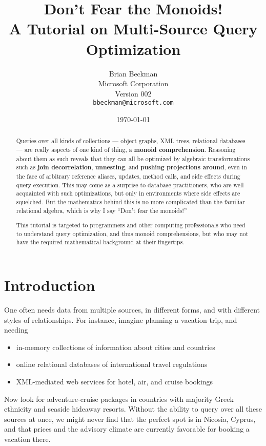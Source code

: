 \title{Don't Fear the Monoids!\\A Tutorial on Multi-Source Query Optimization}
\author{Brian Beckman
\\ Microsoft Corporation  
\\ Version 002
\\ \texttt{bbeckman@microsoft.com}
}
\date{\today}


\begin{abstract}
Queries over all kinds of collections --- object graphs, XML trees, relational databases --- are really aspects of one kind of thing, a \textbf{monoid comprehension}. Reasoning about them as such reveals that they can all be optimized by algebraic transformations such as \textbf{join decorrelation}, \textbf{unnesting}, and \textbf{pushing projections around}, even in the face of arbitrary reference aliases, updates, method calls, and side effects during query execution. This may come as a surprise to database practitioners, who are well acquainted with such optimizations, but only in environments where side effects are squelched. But the mathematics behind this is no more complicated than the familiar relational algebra, which is why I say ``Don't fear the monoids!'' 

This tutorial is targeted to programmers and other computing professionals who need to understand query optimization, and thus monoid comprehensions, but who may not have the required mathematical background at their fingertips.
\end{abstract}


\maketitle


\section{\color{Red}Introduction}


One often needs data from multiple sources, in different forms, and with different styles of relationships. For instance, imagine planning a vacation trip, and needing
\begin{itemize}
	\item in-memory collections of information about cities and countries
  \item online relational databases of international travel regulations
  \item XML-mediated web services for hotel, air, and cruise bookings
\end{itemize}
Now look for adventure-cruise packages in countries with majority Greek ethnicity and seaside hideaway resorts. Without the ability to query over all these sources at once, we might never find that the perfect spot is in Nicosia, Cyprus, and that prices and the advisory climate are currently favorable for booking a vacation there.


